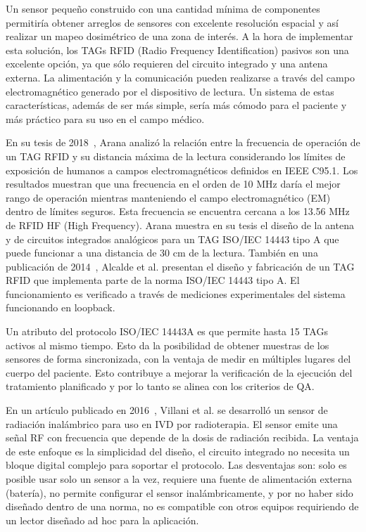 \documentclass[a4paper, twoside, 11pt]{report}
\begin{document}
Un sensor pequeño construido con una cantidad mínima de componentes permitiría obtener arreglos de sensores con excelente resolución espacial y así realizar un mapeo dosimétrico de una zona de interés. A la hora de implementar esta solución, los TAGs RFID (Radio Frequency Identification) pasivos son una excelente opción, ya que sólo requieren del circuito integrado y una antena externa. La alimentación y la comunicación pueden realizarse a través del campo electromagnético generado por el dispositivo de lectura. Un sistema de estas características, además de ser más simple, sería más cómodo para el paciente y más práctico para su uso en el campo médico.

En su tesis de 2018~\cite{Arana_thesis}, Arana analizó la relación entre la frecuencia de operación de un TAG RFID y su distancia máxima de la lectura considerando los límites de exposición de humanos a campos electromagnéticos definidos en IEEE C95.1. Los resultados muestran que una frecuencia en el orden de 10 MHz daría el mejor rango de operación mientras manteniendo el campo electromagnético (EM) dentro de límites seguros. Esta frecuencia se encuentra cercana a los 13.56 MHz de RFID HF (High Frequency). Arana muestra en su tesis el diseño de la antena y de circuitos integrados analógicos para un TAG ISO/IEC 14443 tipo A que puede funcionar a una distancia de 30 cm de la lectura. También en una publicación de 2014~\cite{fabricio_eamta}, Alcalde et al. presentan el diseño y fabricación de un TAG RFID que implementa parte de la norma ISO/IEC 14443 tipo A. El funcionamiento es verificado a través de mediciones experimentales del sistema funcionando en loopback.

Un atributo del protocolo ISO/IEC 14443A es que permite hasta 15 TAGs activos al mismo tiempo. Esto da la posibilidad de obtener muestras de los sensores de forma sincronizada, con la ventaja de medir en múltiples lugares del cuerpo del paciente. Esto contribuye a mejorar la verificación de la ejecución del tratamiento planificado y por lo tanto se alinea con los criterios de QA.

En un artículo publicado en 2016~\cite{monolithic_180nm}, Villani et al. se desarrolló un sensor de radiación inalámbrico para uso en IVD por radioterapia. El sensor emite una señal RF con frecuencia que depende de la dosis de radiación recibida. La ventaja de este enfoque es la simplicidad del diseño, el circuito integrado no necesita un bloque digital complejo para soportar el protocolo. Las desventajas son: solo es posible usar solo un sensor a la vez, requiere una fuente de alimentación externa (batería), no permite configurar el sensor inalámbricamente, y por no haber sido diseñado dentro de una norma, no es compatible con otros equipos requiriendo de un lector diseñado ad hoc para la aplicación.
\end{document}
